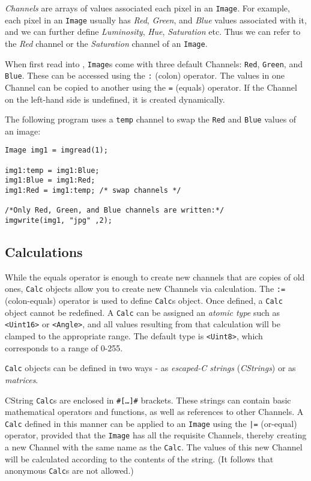 \emph{Channels} are arrays of values associated each pixel in an \texttt{Image}.
For example, each pixel in an \texttt{Image} usually has \emph{Red}, \emph{Green}, and \emph{Blue} values
associated with it, and we can further define \emph{Luminosity}, \emph{Hue}, \emph{Saturation} etc.
Thus we can refer to the \emph{Red} channel or the \emph{Saturation} channel of an \texttt{Image}.

When first read into \sys{}, \texttt{Image}s come with three default Channels:
\texttt{Red}, \texttt{Green}, and \texttt{Blue}. These can be accessed using the \texttt{:} (colon) operator.
The values in one Channel can be copied to another using the \texttt{=} (equals) operator.
If the Channel on the left-hand side is undefined, it is created dynamically.

The following program uses a \texttt{temp} channel to swap the \texttt{Red} and \texttt{Blue} values of an image:

\begin{lstlisting}[language=CLAM,escapechar=\%]
Image img1 = imgread(1);

img1:temp = img1:Blue;
img1:Blue = img1:Red;
img1:Red = img1:temp; /* swap channels */

/*Only Red, Green, and Blue channels are written:*/
imgwrite(img1, "jpg" ,2);
\end{lstlisting}

\subsection{Calculations}

While the equals operator is enough to create new channels that are copies of old ones,
\texttt{Calc} objects allow you to create new Channels via calculation.
The \texttt{:=} (colon-equals) operator is used to define \texttt{Calc}s object.
Once defined, a \texttt{Calc} object cannot be redefined.
A \texttt{Calc} can be assigned an \emph{atomic type} such as \texttt{<Uint16>} or \texttt{<Angle>},
and all values resulting from that calculation will be clamped to the appropriate range.
The default type is \texttt{<Uint8>}, which corresponds to a range of 0-255.
  
\texttt{Calc} objects can be defined in two ways - as \emph{escaped-C strings} (\emph{CStrings}) or as \emph{matrices}.

CString \texttt{Calc}s are enclosed in \texttt{\#[\ldots]\#} brackets. These strings can contain basic mathematical
operators and functions, as well as references to other Channels. A \texttt{Calc}
defined in this manner can be applied to an \texttt{Image} using the \texttt{|=} (or-equal) operator,
provided that the \texttt{Image} has all the requisite Channels,
thereby creating a new Channel with the same name as the \texttt{Calc}. The values of this new
Channel will be calculated according
to the contents of the string. (It follows that anonymous \texttt{Calc}s are not allowed.)\\

